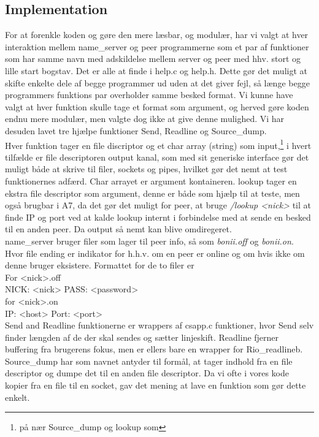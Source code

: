 \documentclass[12pt,a4paper]{article}
\begin{document}
\subsection{Implementation}
For at forenkle koden og gøre den mere læsbar, og modulær, har vi valgt at hver interaktion mellem name_server og peer programmerne som et par af funktioner som har samme navn med adskildelse mellem server og peer med hhv. stort og lille start bogstav. Det er alle at finde i help.c og help.h. Dette gør det muligt at skifte enkelte dele af begge programmer ud uden at det giver fejl, så længe begge programmers funktions par overholder samme besked format. Vi kunne have valgt at hver funktion skulle tage et format som argument, og herved gøre koden endnu mere modulær, men valgte dog ikke at give denne mulighed.
Vi har desuden lavet tre hjælpe funktioner Send, Readline og Source_dump.
\\[10pt]
Hver funktion tager en file discriptor og et char array (string) som input,\footnote{på nær Source_dump og lookup som } i hvert tilfælde er file descriptoren output kanal, som med sit generiske interface gør det muligt både at skrive til filer, sockets og pipes, hvilket gør det nemt at test funktionernes adfærd. Char arrayet er argument kontaineren.
lookup tager en ekstra file descriptor som argument, denne er både som hjælp til at teste, men også brugbar i A7, da det gør det muligt for peer, at bruge \textit{/lookup <nick>} til at finde IP og port ved at kalde lookup internt i forbindelse med at sende en besked til en anden peer. Da output så nemt kan blive omdiregeret.
\\[10pt]
name_server bruger filer som lager til peer info, så som \textit{bonii.off} og \textit{bonii.on}. Hvor file ending er indikator for h.h.v. om en peer er online og om hvis ikke om denne bruger eksistere. Formattet for de to filer er
\\[10pt]
For <nick>.off
\\[5pt]
NICK: <nick> PASS: <password>\n 
\\[10pt]
for <nick>.on
\\[5pt]
IP: <host>
Port: <port>
\\[10pt]
Send and Readline funktionerne er wrappers af csapp.c funktioner, hvor Send selv finder længden af de der skal sendes og sætter linjeskift. Readline fjerner buffering fra brugerens fokus, men er ellers bare en wrapper for Rio_readlineb. Source_dump har som navnet antyder til formål, at tager indhold fra en file descriptor og dumpe det til en anden file descriptor. Da vi ofte i vores kode kopier fra en file til en socket, gav det mening at lave en funktion som gør dette enkelt. 
\end{document}
